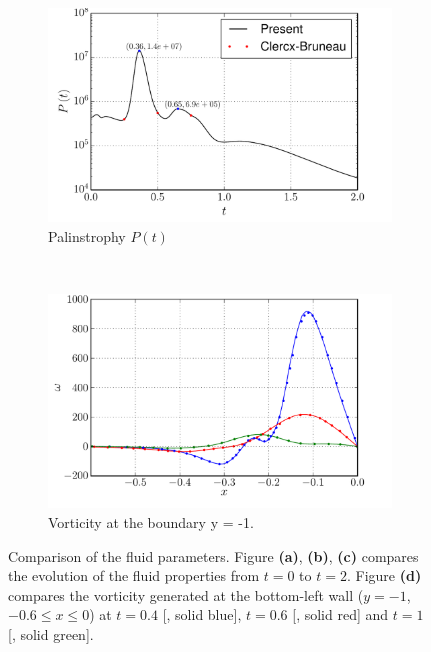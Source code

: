 \begin{figure}[p]
     \begin{subfigure}[b]{0.49\textwidth}
             \includegraphics[width=\textwidth]{figures/eulerian/dipole_Palinstrophy_comparison.pdf}
             \caption{Palinstrophy $P(t)$}
             \label{fig:dipole_Palinstrophy_comparison}
     \end{subfigure}
     ~
     \begin{subfigure}[b]{0.48\textwidth}
		\includegraphics[width=\textwidth]{./figures/eulerian/VorticityAtBoundary.pdf}
		\caption{Vorticity at the boundary y = -1.}
		\label{fig:VorticityAtBoundary}
     \end{subfigure}     
     
     \caption{Comparison of the fluid parameters. Figure \textbf{(a)}, \textbf{(b)}, \textbf{(c)} compares the evolution of the fluid properties from $t=0$ to $t=2$. Figure \textbf{(d)} compares the vorticity generated at the bottom-left wall ($y=-1$, $-0.6\leqslant x \leqslant 0$) at $t=0.4$ [{\color{plotBlue}{---}}, solid blue], $t=0.6$ [{\color{plotRed}{---}}, solid red] and $t=1$ [{\color{plotGreen}{---}}, solid green].}
     \label{fig:dipole_comparison}
	\end{figure}


